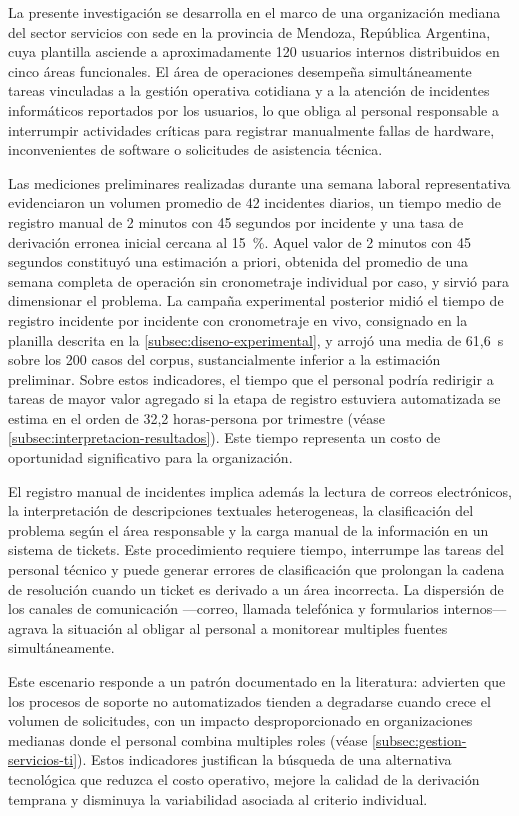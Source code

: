 La presente investigación se desarrolla en el marco de una organización mediana del sector servicios con sede en la provincia de Mendoza, República Argentina, cuya plantilla asciende a aproximadamente 120 usuarios internos distribuidos en cinco áreas funcionales. El área de operaciones desempeña simultáneamente tareas vinculadas a la gestión operativa cotidiana y a la atención de incidentes informáticos reportados por los usuarios, lo que obliga al personal responsable a interrumpir actividades críticas para registrar manualmente fallas de hardware, inconvenientes de software o solicitudes de asistencia técnica.

Las mediciones preliminares realizadas durante una semana laboral representativa evidenciaron un volumen promedio de 42 incidentes diarios, un tiempo medio de registro manual de 2 minutos con 45 segundos por incidente y una tasa de derivación erronea inicial cercana al 15~\%. Aquel valor de 2 minutos con 45 segundos constituyó una estimación a priori, obtenida del promedio de una semana completa de operación sin cronometraje individual por caso, y sirvió para dimensionar el problema. La campaña experimental posterior midió el tiempo de registro incidente por incidente con cronometraje en vivo, consignado en la planilla descrita en la \autoref{subsec:diseno-experimental}, y arrojó una media de 61,6~s sobre los 200 casos del corpus, sustancialmente inferior a la estimación preliminar. Sobre estos indicadores, el tiempo que el personal podría redirigir a tareas de mayor valor agregado si la etapa de registro estuviera automatizada se estima en el orden de 32,2 horas-persona por trimestre (véase \autoref{subsec:interpretacion-resultados}). Este tiempo representa un costo de oportunidad significativo para la organización.

El registro manual de incidentes implica además la lectura de correos electrónicos, la interpretación de descripciones textuales heterogeneas, la clasificación del problema según el área responsable y la carga manual de la información en un sistema de tickets. Este procedimiento requiere tiempo, interrumpe las tareas del personal técnico y puede generar errores de clasificación que prolongan la cadena de resolución cuando un ticket es derivado a un área incorrecta. La dispersión de los canales de comunicación ---correo, llamada telefónica y formularios internos--- agrava la situación al obligar al personal a monitorear multiples fuentes simultáneamente.

Este escenario responde a un patrón documentado en la literatura: \textcite{Galup2009_itsm} advierten que los procesos de soporte no automatizados tienden a degradarse cuando crece el volumen de solicitudes, con un impacto desproporcionado en organizaciones medianas donde el personal combina multiples roles (véase \autoref{subsec:gestion-servicios-ti}). Estos indicadores justifican la búsqueda de una alternativa tecnológica que reduzca el costo operativo, mejore la calidad de la derivación temprana y disminuya la variabilidad asociada al criterio individual.

